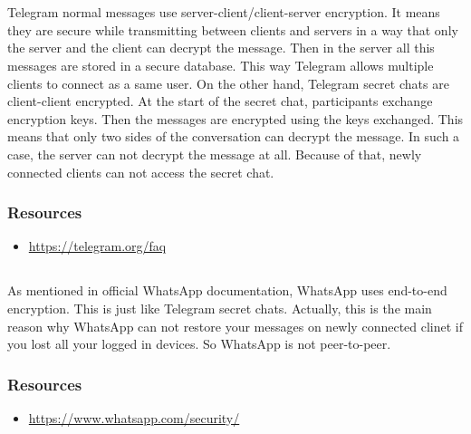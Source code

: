 \documentclass[en]{university}
\begin{document}
\section{}
\subsection{}
Telegram normal messages use server-client/client-server encryption. It means they are secure while transmitting between clients and servers in a way that only the server and the client can decrypt the message.
Then in the server all this messages are stored in a secure database. This way Telegram allows multiple clients to connect as a same user.
On the other hand, Telegram secret chats are client-client encrypted. At the start of the secret chat, participants exchange encryption keys.
Then the messages are encrypted using the keys exchanged.
This means that only two sides of the conversation can decrypt the message. In such a case, the server can not decrypt the message at all. Because of that, newly connected clients can not access the secret chat.
\subsubsection*{Resources}
\begin{itemize}
    \item \href{https://telegram.org/faq}{\url{https://telegram.org/faq}}
\end{itemize}

\subsection{}
As mentioned in official WhatsApp documentation, WhatsApp uses end-to-end encryption. This is just like Telegram secret chats.
Actually, this is the main reason why WhatsApp can not restore your messages on newly connected clinet if you lost all your logged in devices.
So WhatsApp is not peer-to-peer.
\subsubsection*{Resources}
\begin{itemize}
    \item \href{https://www.whatsapp.com/security/}{\url{https://www.whatsapp.com/security/}}
\end{itemize}

\section{}
\end{document}
